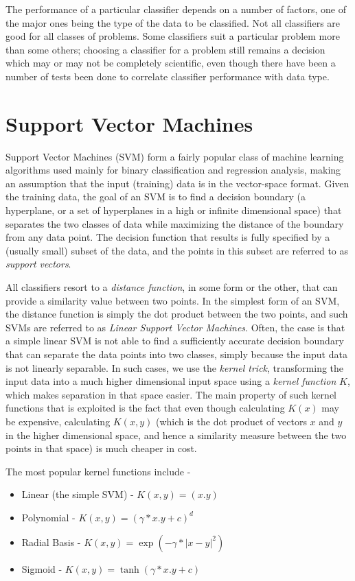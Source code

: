 The performance of a particular classifier depends on a number of factors, one of the major ones being the type of the data to be classified. Not all classifiers are good for all classes of problems. Some classifiers suit a particular problem more than some others; choosing a classifier for a problem still remains a decision which may or may not be completely scientific, even though there have been a number of tests been done to correlate classifier performance with data type.

\section{Support Vector Machines}
Support Vector Machines (SVM) form a fairly popular class of machine learning algorithms used mainly for binary classification and regression analysis, making an assumption that the input (training) data is in the vector-space format. Given the training data, the goal of an SVM is to find a decision boundary (a hyperplane, or a set of hyperplanes in a high or infinite dimensional space) that separates the two classes of data while maximizing the distance of the boundary from any data point. The decision function that results is fully specified by a (usually small) subset of the data, and the points in this subset are referred to as \emph{support vectors}.

All classifiers resort to a \emph{distance function}, in some form or the other, that can provide a similarity value between two points. In the simplest form of an SVM, the distance function is simply the dot product between the two points, and such SVMs are referred to as \emph{Linear Support Vector Machines}. Often, the case is that a simple linear SVM is not able to find a sufficiently accurate decision boundary that can separate the data points into two classes, simply because the input data is not linearly separable. In such cases, we use the \emph{kernel trick}, transforming the input data into a much higher dimensional input space using a \emph{kernel function} $K$, which makes separation in that space easier. The main property of such kernel functions that is exploited is the fact that even though calculating $K(x)$ may be expensive, calculating $K(x, y)$ (which is the dot product of vectors $x$ and $y$ in the higher dimensional space, and hence a similarity measure between the two points in that space) is much cheaper in cost.

The most popular kernel functions include -
\begin{itemize}
    \item{Linear (the simple SVM) - $K(x, y) = (x . y)$ }
    \item{Polynomial - $K(x, y) = (\gamma * x . y + c)^{d}$}
    \item{Radial Basis - $K(x, y) = \exp(-\gamma * {| x - y |}^{2})$}
    \item{Sigmoid - $K(x, y) = \tanh(\gamma * x . y + c)$}
\end{itemize}
